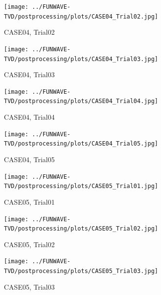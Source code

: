 \documentclass[preprint,10pt]{elsarticle}
\begin{document}
\begin{figure}
\begin{center}
 \texttt{[image: ../FUNWAVE-TVD/postprocessing/plots/CASE04\_Trial02.jpg]}
 \caption{CASE04, Trial02}
 \label{lineargrid}
 \end{center}
 \end{figure}

\begin{figure}
\begin{center}
 \texttt{[image: ../FUNWAVE-TVD/postprocessing/plots/CASE04\_Trial03.jpg]}
 \caption{CASE04, Trial03}
 \label{lineargrid}
 \end{center}
 \end{figure}
 
\begin{figure}
\begin{center}
 \texttt{[image: ../FUNWAVE-TVD/postprocessing/plots/CASE04\_Trial04.jpg]}
 \caption{CASE04, Trial04}
 \label{lineargrid}
 \end{center}
 \end{figure}

\begin{figure}
\begin{center}
 \texttt{[image: ../FUNWAVE-TVD/postprocessing/plots/CASE04\_Trial05.jpg]}
 \caption{CASE04, Trial05}
 \label{lineargrid}
 \end{center}
 \end{figure}

 \begin{figure}
\begin{center}
 \texttt{[image: ../FUNWAVE-TVD/postprocessing/plots/CASE05\_Trial01.jpg]}
 \caption{CASE05, Trial01}
 \label{lineargrid}
 \end{center}
 \end{figure}

\begin{figure}
\begin{center}
 \texttt{[image: ../FUNWAVE-TVD/postprocessing/plots/CASE05\_Trial02.jpg]}
 \caption{CASE05, Trial02}
 \label{lineargrid}
 \end{center}
 \end{figure}

\begin{figure}
\begin{center}
 \texttt{[image: ../FUNWAVE-TVD/postprocessing/plots/CASE05\_Trial03.jpg]}
 \caption{CASE05, Trial03}
 \label{lineargrid}
 \end{center}
 \end{figure}
 
\end{document}
